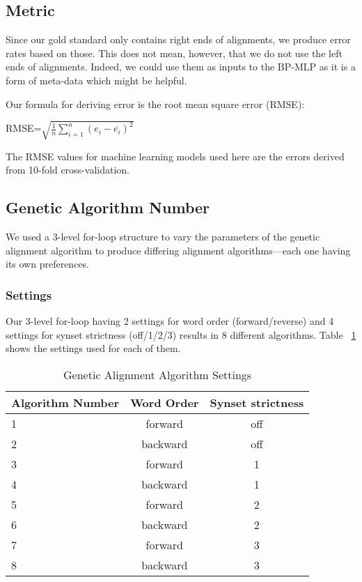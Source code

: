 \subsection{Metric}
Since our gold standard only contains right ends of alignments, we produce error rates based on those. This does not mean, however, that we do not use the left ends of alignments. Indeed, we could use them as inputs to the BP-MLP as it is a form of meta-data which might be helpful.

Our formula for deriving error is the root mean square error (RMSE):

\begin{center}
	RMSE=$\sqrt{\frac{1}{n}\sum_{i=1}^{n}{(e_i-\overline{e_i})^2}}$
\end{center}

The RMSE values for machine learning models used here are the errors derived from 10-fold cross-validation.


\subsection{Genetic Algorithm Number}%
We used a 3-level for-loop structure to vary the parameters of the genetic alignment algorithm to produce differing alignment algorithms---each one having its own preferences. 

\subsubsection{Settings}
Our 3-level for-loop having 2 settings for word order (forward/reverse) and 4 settings for synset strictness (off/1/2/3) results in 8 different algorithms. Table ~\ref{tab:settings} shows the settings used for each of them.%

\begin{table}[center]
	\centering
	\begin{tabular} {|l | c | c |}
		\hline	\textbf{Algorithm Number} & \textbf{Word Order} & \textbf{Synset strictness}\\
		\hline	1	&	forward		&	off	\\
		\hline	2	&	backward	&	off	\\
		\hline	3	&	forward		&	1	\\
		\hline	4	&	backward	&	1	\\
		\hline	5	&	forward		&	2	\\
		\hline	6	&	backward	&	2	\\
		\hline	7	&	forward		&	3	\\
		\hline	8	&	backward	&	3	\\ \hline
	\end{tabular}
	\caption{Genetic Alignment Algorithm Settings}
	\label{tab:settings}
\end{table}
